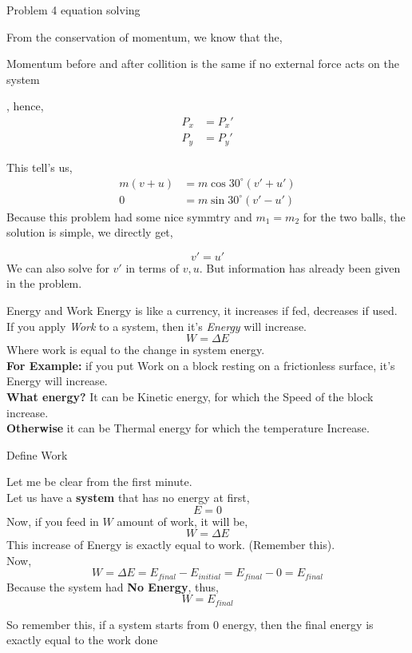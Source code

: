 \documentclass[9pt]{memoir}
\newcommand{\id}[1]{ \begin{idea} #1 \end{idea} }
\begin{document}
\begin{frame}
    {Problem 4 equation solving}    
    \begin{small}    From the conservation of momentum, we know that the, 
    \id{Momentum before and after collition is the same if no external force acts on the system     }, hence, 
    \begin{align*}
        P_x &= P_x' \\
        P_y &= P_y '    
    \end{align*}

    This tell's us, 
    \begin{align*}
        m\left( v + u \right)  &= m \cos 30^{\circ} \left( v' + u' \right) \\
        0 &= m \sin 30^{\circ} \left( v' - u' \right)  
    \end{align*}
Because this problem had some nice symmtry and $m_1 = m_2$ for the two balls, the solution is simple, we directly get, 
   
\[ \boxed{v' = u'} \]
    We can also solve for $v'$ in terms of $v, u$. But information has already been given in the problem.
\end{small}
\end{frame}

%
%
%
%
%
%

\begin{frame}
    {Energy and Work}
            Energy is like a currency, it increases if fed, decreases if used. \\
        If you apply \emph{Work} to a system, then it's \emph{Energy} will increase. 
        \[ W = \Delta E \]
        Where work is equal to the change in system energy. \\
        \textbf{For Example:} if you put Work on a block resting on a frictionless surface, it's Energy will increase. \\
        \textbf{What energy?} It can be Kinetic energy, for which the Speed of the block increase. \\
        \textbf{Otherwise} it can be Thermal energy for which the temperature Increase. 
\end{frame}

%
%
%
%
\begin{frame}
    {Define Work}
    \begin{small}    Let me be clear from the first minute. \\
    Let us have a \textbf{system} that has no energy at first, 
    \[ E =0 \]
    Now, if you feed in $W$ amount of work, it will be, 
    \[ W = \Delta E \]
    This increase of Energy is exactly equal to work. (Remember this). \\
    Now, 
    \[ W = \Delta E = E_{final} - E_{initial} = E_{final} - 0 = E_{final} \]
    Because the system had \textbf{No Energy}, thus, 
    \[ W = E_{final} \] \end{small}
    \id{So remember this, if a system starts from 0 energy, then the final energy is exactly equal to the work done}
        
\end{frame}
%
\end{document}
